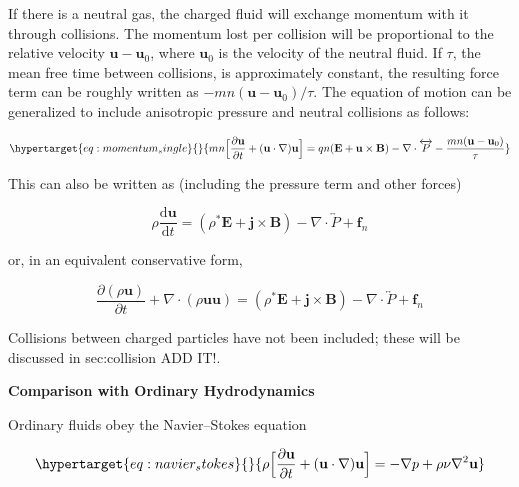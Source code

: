 \documentclass[
  notoc %
]{tufte-book}
\begin{document}
If there is a neutral gas, the charged fluid will exchange momentum with
it through collisions. The momentum lost per collision will be
proportional to the relative velocity \(\mathbf{u}-\mathbf{u}_0\), where
\(\mathbf{u}_0\) is the velocity of the neutral fluid. If \(\tau\), the
mean free time between collisions, is approximately constant, the
resulting force term can be roughly written as
\(-mn(\mathbf{u}-\mathbf{u}_0)/\tau\). The equation of motion can be
generalized to include anisotropic pressure and neutral collisions as
follows:

\begin{equation}\protect\hypertarget{eq:momentum_single}{}{
mn\Big[\frac{\partial\mathbf{u}}{\partial t} + (\mathbf{u}\cdot\nabla)\mathbf{u}\Big] = qn(\mathbf{E}+\mathbf{u}\times\mathbf{B}) - \nabla\cdot\overleftrightarrow{P} - \frac{mn(\mathbf{u}-\mathbf{u}_0)}{\tau}
}\label{eq:momentum_single}\end{equation}

This can also be written as (including the pressure term and other
forces)

\[
\rho\frac{\mathrm{d}\mathbf{u}}{\mathrm{d}t}=(\rho^\ast \mathbf{E}+\mathbf{j}\times\mathbf{B})-\nabla\cdot\overleftrightarrow{P}+\mathbf{f}_n
\]

or, in an equivalent conservative form,

\[
\frac{\partial (\rho\mathbf{u})}{\partial t}+\nabla\cdot(\rho\mathbf{u}\mathbf{u})=(\rho^\ast \mathbf{E}+\mathbf{j}\times\mathbf{B})-\nabla\cdot\overleftrightarrow{P}+\mathbf{f}_n
\]

Collisions between charged particles have not been included; these will
be discussed in sec:collision ADD IT!.

\textbf{Comparison with Ordinary Hydrodynamics}

Ordinary fluids obey the Navier--Stokes equation

\begin{equation}\protect\hypertarget{eq:navier_stokes}{}{
\rho\Big[ \frac{\partial\mathbf{u}}{\partial t} + (\mathbf{u}\cdot\nabla)\mathbf{u} \Big] = -\nabla p + \rho\nu\nabla^2\mathbf{u}
}\label{eq:navier_stokes}\end{equation}
\end{document}
